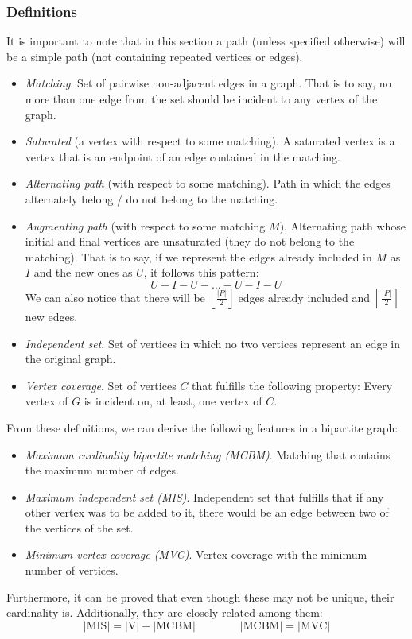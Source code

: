 \subsubsection*{Definitions}
It is important to note that in this section a path 
(unless specified otherwise) will be a simple path (not containing repeated
vertices or edges).
\begin{itemize}
		\setlength{\itemsep}{2pt}
		\item \textit{Matching}. Set of pairwise non-adjacent edges in a graph.
				That is to say, no more than one edge from the set should be
				incident to any vertex of the graph.
		\item \textit{Saturated} (a vertex with respect to some matching). A
				saturated vertex is a vertex that is an endpoint of an edge
				contained in the matching.
		\item \textit{Alternating path }(with respect to some matching). Path
				in which the edges alternately belong / do not belong to the 
				matching.
		\item \textit{Augmenting path }(with respect to some matching $M$). 
				Alternating path whose initial and final vertices are 
				unsaturated (they do not belong to the matching).
				That is to say, if we represent the edges already
				included in $M$ as $I$ and the new ones as $U$, it
				follows this pattern:
				\[
					 U - I - U - \dots - U - I - U
			 	\]
				We can also notice that there will be 
				$\left\lfloor \frac{|P|}2 \right \rfloor$ edges already
				included and 
				$\left\lceil \frac{|P|}2 \right \rceil$ new edges.
		\item \textit{Independent set}. Set of vertices in which no
				two vertices represent an edge in the original graph.
		\item \textit{Vertex coverage}. Set of vertices $C$ that fulfills
				the following property: Every vertex of $G$ is incident on,
				at least, one vertex of $C$.
\end{itemize}
From these definitions, we can derive the following features in a bipartite
graph:
\begin{itemize}
		\item \textit{Maximum cardinality bipartite matching (MCBM)}. 
				Matching that contains the maximum number of edges.
		\item \textit{Maximum independent set (MIS)}. Independent set that
				fulfills that if any other vertex was to be added to it, there
				would be an edge between two of the vertices of the set.
		\item \textit{Minimum vertex coverage (MVC)}. Vertex coverage with the 
				minimum number of vertices.
\end{itemize}
Furthermore, it can be proved that even though these  may not be
unique, their cardinality is. Additionally, they are closely related among 
them:
\[
		\mathrm{|MIS| = |V| - |MCBM| }
		\qquad 
		\qquad 
		\mathrm{|MCBM| = |MVC|}
\]
\newpage
